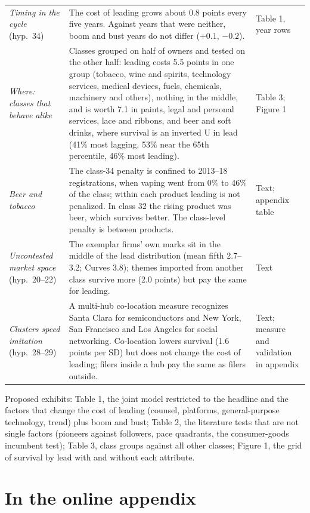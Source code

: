 \begin{longtable}{>{\raggedright\arraybackslash}p{3.0cm}>{\raggedright\arraybackslash}p{8.6cm}>{\raggedright\arraybackslash}p{2.5cm}}
\addlinespace
\emph{Timing in the cycle} (hyp.\ 34) & The cost of leading grows about 0.8 points every five years. Against years that were neither, boom and bust years do not differ ($+0.1$, $-0.2$). & Table 1, year rows \\
\addlinespace
\emph{Where: classes that behave alike} & Classes grouped on half of owners and tested on the other half: leading costs 5.5 points in one group (tobacco, wine and spirits, technology services, medical devices, fuels, chemicals, machinery and others), nothing in the middle, and is worth 7.1 in paints, legal and personal services, lace and ribbons, and beer and soft drinks, where survival is an inverted U in lead (41\% most lagging, 53\% near the 65th percentile, 46\% most leading). & Table 3; Figure 1 \\
\addlinespace
\emph{Beer and tobacco} & The class-34 penalty is confined to 2013--18 registrations, when vaping went from 0\% to 46\% of the class; within each product leading is not penalized. In class 32 the rising product was beer, which survives better. The class-level penalty is between products. & Text; appendix table \\
\addlinespace
\emph{Uncontested market space} \citep{KimMauborgne2004} (hyp.\ 20--22) & The exemplar firms' own marks sit in the middle of the lead distribution (mean fifth 2.7--3.2; Curves 3.8); themes imported from another class survive more (2.0 points) but pay the same for leading. & Text \\
\addlinespace
\emph{Clusters speed imitation} (hyp.\ 28--29) & A multi-hub co-location measure recognizes Santa Clara for semiconductors and New York, San Francisco and Los Angeles for social networking. Co-location lowers survival (1.6 points per SD) but does not change the cost of leading; filers inside a hub pay the same as filers outside. & Text; measure and validation in appendix \\
\bottomrule
\end{longtable}

\noindent Proposed exhibits: Table 1, the joint model restricted to the
headline and the factors that change the cost of leading (counsel,
platforms, general-purpose technology, trend) plus boom and bust;
Table 2, the literature tests that are not single factors (pioneers
against followers, pace quadrants, the consumer-goods incumbent test);
Table 3, class groups against all other classes; Figure 1, the grid of
survival by lead with and without each attribute.

\section*{In the online appendix}

